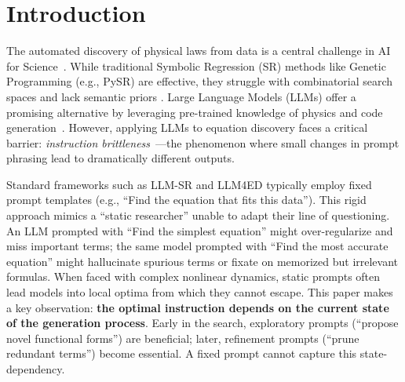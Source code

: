 \documentclass[twoside,11pt]{article}
\let\cite\citep
\newcommand{\1}{{\bf 1}}
\newcommand{\0}{{\bf 0}}
\begin{document}

%
%
%
%
%
%


\section{Introduction}

The automated discovery of physical laws from data is a central challenge in AI for Science~\citep{wang2023scientific,raghu2020survey}. While traditional Symbolic Regression (SR) methods like Genetic Programming (e.g., PySR) are effective, they struggle with combinatorial search spaces and lack semantic priors \cite{cranmer2020discovering}. Large Language Models (LLMs) offer a promising alternative by leveraging pre-trained knowledge of physics and code generation~\citep{chen2021evaluating,wei2022chain}. However, applying LLMs to equation discovery faces a critical barrier: \textit{instruction brittleness}~\citep{sclar2024quantifying,mizrahi2024state}---the phenomenon where small changes in prompt phrasing lead to dramatically different outputs.

Standard frameworks such as LLM-SR \citep{shojaee2024llmsr} and LLM4ED \citep{du2024llm4ed} typically employ fixed prompt templates (e.g., ``Find the equation that fits this data''). This rigid approach mimics a ``static researcher'' unable to adapt their line of questioning. An LLM prompted with ``Find the simplest equation'' might over-regularize and miss important terms; the same model prompted with ``Find the most accurate equation'' might hallucinate spurious terms or fixate on memorized but irrelevant formulas. When faced with complex nonlinear dynamics, static prompts often lead models into local optima from which they cannot escape. This paper makes a key observation: \textbf{the optimal instruction depends on the current state of the generation process}. Early in the search, exploratory prompts (``propose novel functional forms'') are beneficial; later, refinement prompts (``prune redundant terms'') become essential. A fixed prompt cannot capture this state-dependency. 
\end{document}

